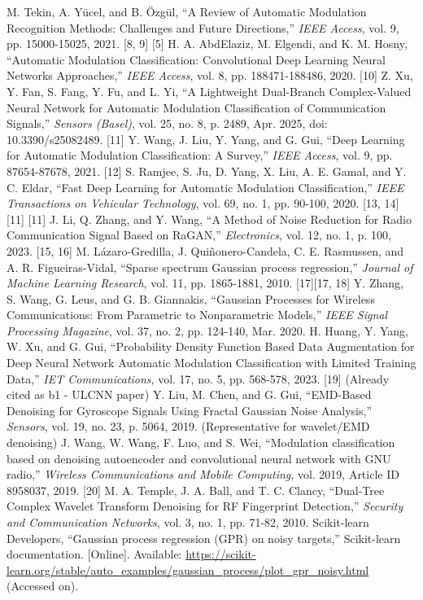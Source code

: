 \documentclass[conference]{IEEEtran}
\begin{document}
\begin{thebibliography}{00}
\bibitem{[8]} M. Tekin, A. Yücel, and B. Özgül, ``A Review of Automatic Modulation Recognition Methods: Challenges and Future Directions,'' \textit{IEEE Access}, vol. 9, pp. 15000-15025, 2021. [8, 9]
\bibitem{[5]} [5]
\bibitem{[10]} H. A. AbdElaziz, M. Elgendi, and K. M. Hosny, ``Automatic Modulation Classification: Convolutional Deep Learning Neural Networks Approaches,'' \textit{IEEE Access}, vol. 8, pp. 188471-188486, 2020. [10]
\bibitem{[11]} Z. Xu, Y. Fan, S. Fang, Y. Fu, and L. Yi, ``A Lightweight Dual-Branch Complex-Valued Neural Network for Automatic Modulation Classification of Communication Signals,'' \textit{Sensors (Basel)}, vol. 25, no. 8, p. 2489, Apr. 2025, doi: 10.3390/s25082489. [11]
\bibitem{[12]} Y. Wang, J. Liu, Y. Yang, and G. Gui, ``Deep Learning for Automatic Modulation Classification: A Survey,'' \textit{IEEE Access}, vol. 9, pp. 87654-87678, 2021. [12]
\bibitem{[13]} S. Ramjee, S. Ju, D. Yang, X. Liu, A. E. Gamal, and Y. C. Eldar, ``Fast Deep Learning for Automatic Modulation Classification,'' \textit{IEEE Transactions on Vehicular Technology}, vol. 69, no. 1, pp. 90-100, 2020. [13, 14]
\bibitem{[11]} [11]
\bibitem{[46]} [11]
\bibitem{[15]} J. Li, Q. Zhang, and Y. Wang, ``A Method of Noise Reduction for Radio Communication Signal Based on RaGAN,'' \textit{Electronics}, vol. 12, no. 1, p. 100, 2023. [15, 16]
\bibitem{[17]} M. Lázaro-Gredilla, J. Quiñonero-Candela, C. E. Rasmussen, and A. R. Figueiras-Vidal, ``Sparse spectrum Gaussian process regression,'' \textit{Journal of Machine Learning Research}, vol. 11, pp. 1865-1881, 2010. [17][17, 18]
\bibitem{[18]} Y. Zhang, S. Wang, G. Leus, and G. B. Giannakis, ``Gaussian Processes for Wireless Communications: From Parametric to Nonparametric Models,'' \textit{IEEE Signal Processing Magazine}, vol. 37, no. 2, pp. 124-140, Mar. 2020.
\bibitem{[19]} H. Huang, Y. Yang, W. Xu, and G. Gui, ``Probability Density Function Based Data Augmentation for Deep Neural Network Automatic Modulation Classification with Limited Training Data,'' \textit{IET Communications}, vol. 17, no. 5, pp. 568-578, 2023. [19]
\bibitem{[48]} (Already cited as b1 - ULCNN paper)
\bibitem{[55]} Y. Liu, M. Chen, and G. Gui, ``EMD-Based Denoising for Gyroscope Signals Using Fractal Gaussian Noise Analysis,'' \textit{Sensors}, vol. 19, no. 23, p. 5064, 2019. (Representative for wavelet/EMD denoising)
\bibitem{[20]} J. Wang, W. Wang, F. Luo, and S. Wei, ``Modulation classification based on denoising autoencoder and convolutional neural network with GNU radio,'' \textit{Wireless Communications and Mobile Computing}, vol. 2019, Article ID 8958037, 2019. [20]
\bibitem{[56]} M. A. Temple, J. A. Ball, and T. C. Clancy, ``Dual-Tree Complex Wavelet Transform Denoising for RF Fingerprint Detection,'' \textit{Security and Communication Networks}, vol. 3, no. 1, pp. 71-82, 2010.
\bibitem{[63]} Scikit-learn Developers, ``Gaussian process regression (GPR) on noisy targets,'' Scikit-learn documentation. [Online]. Available: \url{https://scikit-learn.org/stable/auto_examples/gaussian_process/plot_gpr_noisy.html} (Accessed on).

\end{thebibliography}
\end{document}
